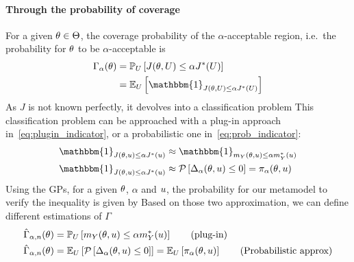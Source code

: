 \documentclass[../../Main_ManuscritThese.tex]{subfiles}
\begin{document}
  
\paragraph{Through the probability of coverage}


For a given $\theta\in\Theta$, the coverage probability of the $\alpha$-acceptable region, i.e.\ the probability for $\theta$ to be $\alpha$-acceptable is
\begin{align}
  \Gamma_{\alpha}(\kk) &= \Prob_{U}\left[J(\kk,\UU) \leq \alpha J^*(\UU)\right] \\
                              & =\Ex_{U}\left[\mathbbm{1}_{J(\kk,\UU) \leq \alpha J^*(\UU)}\right]
\end{align}
As $J$ is not known perfectly, it devolves into a classification problem
This classification problem can be approached with a plug-in approach in~\cref{eq:plugin_indicator}, or a probabilistic one in~\cref{eq:prob_indicator}:
\begin{align}
  \mathbbm{1}_{J(\kk,\uu) \leq \alpha J^*(\uu)} &\approx   \mathbbm{1}_{m_Y(\kk,\uu) \leq \alpha m_Y^*(\uu)} \label{eq:plugin_indicator} \\
  \mathbbm{1}_{J(\kk,\uu) \leq \alpha J^*(\uu)} &\approx   \ProbGP\left[ \Delta_{\alpha}(\kk,\uu) \leq 0 \right] = \pi_{\alpha}(\kk,\uu) \label{eq:prob_indicator}
\end{align}
Using the GPs, for a given $\theta$, $\alpha$ and $u$, the probability for our metamodel to verify the inequality is given by
Based on those two approximation, we can define different estimations of $\Gamma$
\begin{align}
  \hat{\Gamma}_{\alpha, n}(\theta) &= \mathbb{P}_U\left[m_Y(\theta,u) \leq \alpha m_Y^*(u) \right] \tag{plug-in} \\
  \hat{\Gamma}_{\alpha, n}(\theta) &= \mathbb{E}_U\left[ \mathcal{P}\left[ \Delta_{\alpha}(\theta,u) \leq 0\right]\right]  = \mathbb{E}_U\left[\pi_{\alpha}(\theta,u)\right]\tag{Probabilistic approx} \\
\end{align}
\end{document}
